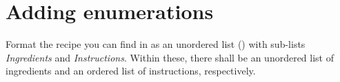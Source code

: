 \section{Adding enumerations}

Format the recipe you can find in  as an 
unordered list () with sub-lists \emph{Ingredients} 
and \emph{Instructions}. 
Within these, there shall be an unordered list of ingredients and an ordered list of 
instructions, respectively.

